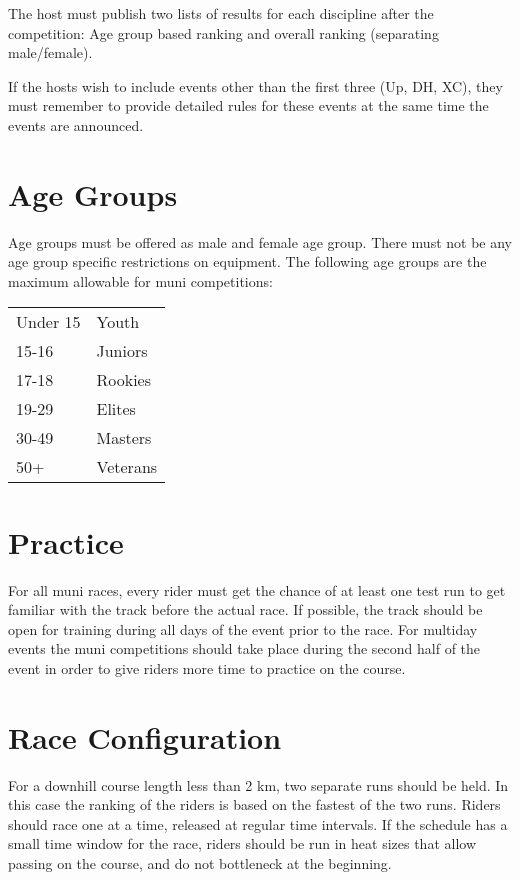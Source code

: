 The host must publish two lists of results for each discipline after the competition: Age group based ranking and overall ranking (separating
male/female).

If the hosts wish to include events other than the first three (Up, DH, XC), they must remember to provide detailed rules for these events at the same time the events are announced.

\section{Age Groups}
Age groups must be offered as male and female age group.
There must not be any age group specific restrictions on equipment.
The following age groups are the maximum allowable for muni competitions:

\begin{tabular}{ l l}
Under 15 & Youth \\
15-16 & Juniors \\
17-18 & Rookies \\
19-29 & Elites \\
30-49 & Masters \\
50+ & Veterans \\
\end{tabular}

\section{Practice}

For all muni races, every rider must get the chance of at least one test run to get familiar with the track before the actual race.
If possible, the track should be open for training during all days of the event prior to the race.
For multiday events the muni competitions should take place during the second half of the event in order to give riders more time to practice on the course.

\section{Race Configuration}

For a downhill course length less than 2 km, two separate runs should be held.
In this case the ranking of the riders is based on the fastest of the two runs.
Riders should race one at a time, released at regular time intervals.
If the schedule has a small time window for the race, riders should be run in heat sizes that allow passing on the course, and do not bottleneck at the beginning.


